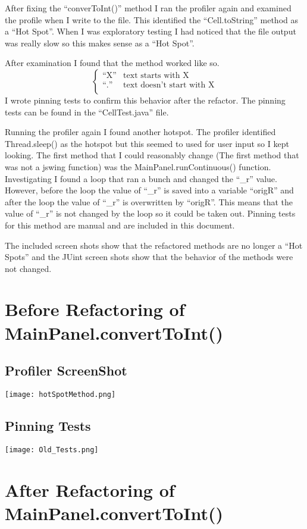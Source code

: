 \documentclass[titlepage]{article}
\begin{document}
After fixing the ``converToInt()'' method I ran the profiler again and examined 
the profile when I write to the file. This identified the ``Cell.toString''
method as a ``Hot Spot''. When I was exploratory testing I had 
noticed that the file output was really slow so this makes sense as a 
``Hot Spot''. 

After examination I found that the method worked like so.
\[  
	\begin{cases}
		\text{``X''} & \text{text starts with X} \\ 
		\text{``.''} & \text{text doesn't start with X} \\
	\end{cases}
\] 
I wrote pinning tests to confirm this behavior after the refactor. The pinning 
tests can be found in the ``CellTest.java'' file.

Running the profiler again I found another hotspot. The profiler identified Thread.sleep() as the hotspot but this seemed to used for user input so I kept looking. The first method that I could reasonably change (The first method that was not a jswing function) was the MainPanel.runContinuous() function. Investigating I found a loop that ran a bunch and changed the ``\_r'' value. However, before the loop the value of ``\_r'' is saved into a variable ``origR'' and after the loop the value of ``\_r'' is overwritten by ``origR''. This means that the value of ``\_r'' is not changed by the loop so it could be taken out. Pinning tests for this method are manual and are included in this document.

The included screen shots show that the refactored methods are no longer a ``Hot 
Spots'' and the JUint screen shots show that the behavior of the methods were not 
changed.

\newpage
\section{Before Refactoring of MainPanel.convertToInt()}
\subsection{Profiler ScreenShot}
\texttt{[image: hotSpotMethod.png]}
\subsection{Pinning Tests}
\texttt{[image: Old\_Tests.png]}
\section{After Refactoring of MainPanel.convertToInt()}
\end{document}
